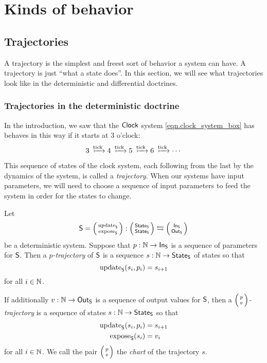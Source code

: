 \documentclass[DynamicalBook]{subfiles}
\begin{document}
\section{Kinds of behavior}\label{sec.kinds_of_behavior}
\subsection{Trajectories}

A trajectory is the simplest and freest sort of behavior a system can have. A
trajectory is just ``what a state does''. In this section, we will see what
trajectories look like in the deterministic and differential doctrines.

\subsubsection{Trajectories in the deterministic doctrine}\label{sec.trajectory_discrete}
In the introduction, we saw that the $\mathsf{Clock}$ system
\cref{eqn.clock_system_box} has behaves in this way if it starts at $3$ o'clock: 
$$3 \xmapsto{\fun{tick}} 4 \xmapsto{\fun{tick}} 5 \xmapsto{\fun{tick}} 6
\xmapsto{\fun{tick}} \cdots$$

This sequence of states of the clock system, each following from the last by the
dynamics of the system, is called a \emph{trajectory}. When our systems have
input parameters, we will need to choose a sequence of input parameters to feed
the system in order for the states to change.

\begin{definition}\label{def.trajectory_discrete}
 Let $$\Sys{S} = \lens{\update{S}}{\expose{S}} : \lens{\State{S}}{\State{S}}
 \leftrightarrows \lens{\In{S}}{\Out{S}}$$
 be a deterministic system. Suppose that $p : \mathbb{N} \to \mathsf{In}_{\mathsf{S}}$ is a sequence of
 parameters for $\mathsf{S}$. Then a \emph{$p$-trajectory} of $\mathsf{S}$ is a sequence $s : \mathbb{N} \to \mathsf{State}_{\mathsf{S}}$ of states so that
 $$\mathrm{update}_{\mathsf{S}}(s_i, p_i) = s_{i + 1}$$
 for all $i \in \mathbb{N}$.

 If additionally $v : \mathbb{N} \to \mathsf{Out}_{\mathsf{S}}$ is a sequence of output values for $\mathsf{S}$, then a
 \emph{$\lens{p}{v}$-trajectory} is a sequence of states $s : \mathbb{N} \to \mathsf{State}_{\mathsf{S}}$ so
 that
 \begin{align*}
   \mathrm{update}_{\mathsf{S}}(s_i, p_i) &= s_{i + 1}\\
   \mathrm{expose}_{\mathsf{S}}(s_i) &= v_i
 \end{align*}
 for all $i \in \mathbb{N}$. We call the pair $\lens{p}{v}$ the \emph{chart} of the trajectory $s$.
\end{definition}
\end{document}
